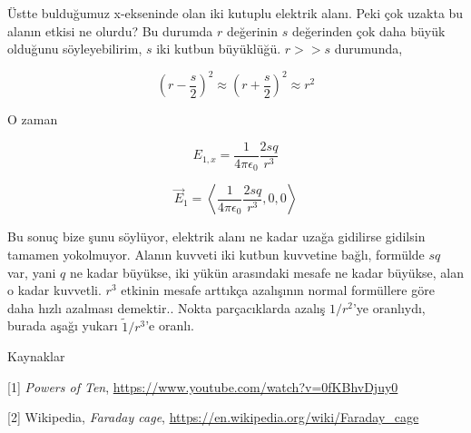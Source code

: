 \documentclass[12pt,fleqn]{article}\usepackage{../../common}
\begin{document}
Üstte bulduğumuz x-ekseninde olan iki kutuplu elektrik alanı. Peki çok uzakta bu
alanın etkisi ne olurdu? Bu durumda $r$ değerinin $s$ değerinden çok daha büyük
olduğunu söyleyebilirim, $s$ iki kutbun büyüklüğü. $r >> s$ durumunda,

$$
\left( r-\frac{s}{2}\right)^2 \approx \left( r+\frac{s}{2}\right)^2 \approx r^2
$$

O zaman

$$
E_{1,x} = \frac{1}{4\pi\epsilon_0} \frac{2sq}{r^3}
$$

$$
\vec{E}_1 = \left<  \frac{1}{4\pi\epsilon_0} \frac{2 sq}{r^3}, 0, 0 \right>
$$

Bu sonuç bize şunu söylüyor, elektrik alanı ne kadar uzağa gidilirse gidilsin
tamamen yokolmuyor. Alanın kuvveti iki kutbun kuvvetine bağlı, formülde $sq$
var, yani $q$ ne kadar büyükse, iki yükün arasındaki mesafe ne kadar büyükse,
alan o kadar kuvvetli. $r^3$ etkinin mesafe arttıkça azalışının normal
formüllere göre daha hızlı azalması demektir.. Nokta parçacıklarda azalış
$1/r^2$'ye oranlıydı, burada aşağı yukarı $\tilde 1/r^3$'e oranlı. 

Kaynaklar

[1] {\em Powers of Ten}, \url{https://www.youtube.com/watch?v=0fKBhvDjuy0}

[2] Wikipedia, {\em Faraday cage}, \url{https://en.wikipedia.org/wiki/Faraday_cage}
  
\end{document}
